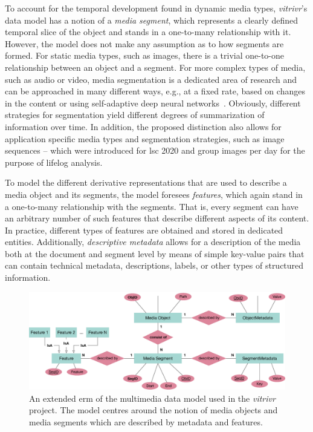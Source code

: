 To account for the temporal development found in dynamic media types, \emph{vitrivr}'s data model has a notion of a \emph{media segment}, which represents a clearly defined temporal slice of the object and stands in a one-to-many relationship with it. However, the model does not make any assumption as to how segments are formed. For static media types, such as images, there is a trivial one-to-one relationship between an object and a segment. For more complex types of media, such as audio or video, media segmentation is a dedicated area of research \cite{Koprinska:2001temporal} and can be approached in many different ways, e.g., at a fixed rate, based on changes in the content \cite{Foote:2000Automatic,Tsai:2016video} or using self-adaptive deep neural networks~\cite{Souvcek:2019transnet}. Obviously, different strategies for segmentation yield different degrees of summarization of information over time. In addition, the proposed distinction also allows for application specific media types and segmentation strategies, such as image sequences -- which were introduced for \acrshort{lsc} 2020 \cite{Heller:2020Interactive} and group images per day for the purpose of lifelog analysis.

To model the different derivative representations that are used to describe a media object and its segments, the model foresees \emph{features}, which again stand in a one-to-many relationship with the segments. That is, every segment can have an arbitrary number of such features that describe different aspects of its content. In practice, different types of features are obtained and stored in dedicated entities. Additionally, \emph{descriptive metadata} allows for a description of the media both at the document and segment level by means of simple key-value pairs that can contain technical metadata, descriptions, labels, or other types of structured information.

\begin{figure}[bt]
    \centering
    \includegraphics[width=\textwidth]{figures/erm-media-data-vitrivr}
    \caption{An extended \acrshort{erm} of the multimedia data model used in the \emph{vitrivr} project. The model centres around the notion of media objects and media segments which are described by metadata and features.}
    \label{figure:erm_mediadata_vitrivr}
\end{figure}

